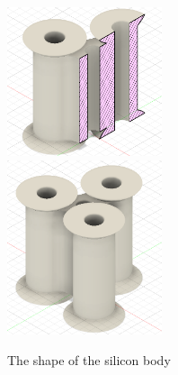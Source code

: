 \documentclass[twoside, 11pt]{article}
\begin{document}
\begin{figure}[H]
	\begin{subfigure}[t]{0.5\linewidth}
	\centering
	\includegraphics[width=0.5\textwidth]{silicon_body_half}%
	\includegraphics[width=0.5\textwidth]{silicon_body}
	\caption{The shape of the silicon body}
	\end{subfigure}
	\begin{subfigure}[t]{0.17\linewidth}
		\centering

\end{subfigure}
\end{figure}
\end{document}
